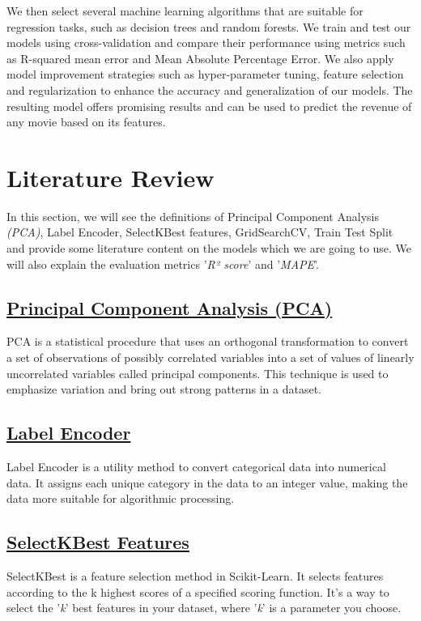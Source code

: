 \documentclass[conference]{IEEEtran}
\begin{document}
        We then select several machine learning algorithms that are suitable for regression tasks, such as decision trees and random forests. We train and test our models using cross-validation and compare their performance using metrics such as R-squared mean error and Mean Absolute Percentage Error. We also apply model improvement strategies such as hyper-parameter tuning, feature selection and regularization to enhance the accuracy and generalization of our models. The resulting model offers promising results and can be used to predict the revenue of any movie based on its features.

\section{Literature Review}
    In this section, we will see the definitions of Principal Component Analysis \textit{(PCA)}, Label Encoder, SelectKBest features, GridSearchCV, Train Test Split and provide some literature content on the models which we are going to use. We will also explain the evaluation metrics '\textit{R² score}' and '\textit{MAPE}'.

    \subsection*{\href{https://en.wikipedia.org/wiki/Principal_component_analysis}{Principal Component Analysis (PCA)}}
    PCA is a statistical procedure that uses an orthogonal transformation to convert a set of observations of possibly correlated variables into a set of values of linearly uncorrelated variables called principal components. This technique is used to emphasize variation and bring out strong patterns in a dataset.

    \subsection*{\href{https://scikit-learn.org/stable/modules/generated/sklearn.preprocessing.LabelEncoder.html}{Label Encoder}}
    Label Encoder is a utility method to convert categorical data into numerical data. It assigns each unique category in the data to an integer value, making the data more suitable for algorithmic processing.

    \subsection*{\href{https://scikit-learn.org/stable/modules/generated/sklearn.feature_selection.SelectKBest.html}{SelectKBest Features}}
    SelectKBest is a feature selection method in Scikit-Learn. It selects features according to the k highest scores of a specified scoring function. It's a way to select the '\textit{k}' best features in your dataset, where '\textit{k}' is a parameter you choose.
\end{document}
